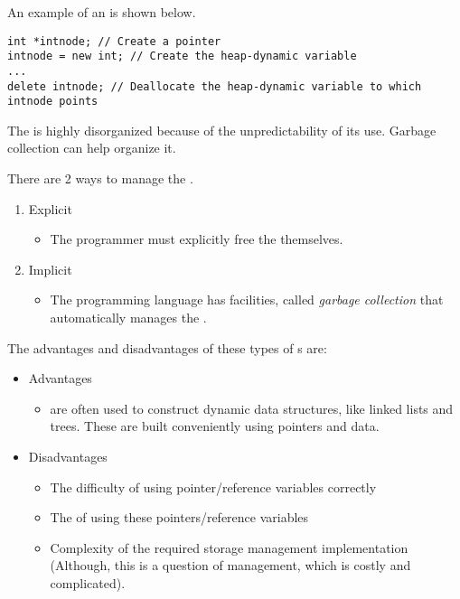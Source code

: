 An example of an  is shown below.
\begin{verbatim}
int *intnode; // Create a pointer
intnode = new int; // Create the heap-dynamic variable
...
delete intnode; // Deallocate the heap-dynamic variable to which intnode points
\end{verbatim}

The  is highly disorganized because of the unpredictability of its use.
Garbage collection can help organize it.

There are 2 ways to manage the .
\begin{enumerate}[noitemsep]
\item Explicit 
  \begin{itemize}[noitemsep]
  \item The programmer must explicitly free the  themselves.
  \end{itemize}
\item Implicit 
  \begin{itemize}[noitemsep]
  \item The programming language has facilities, called \emph{garbage collection} that automatically manages the .
  \end{itemize}
\end{enumerate}

The advantages and disadvantages of these types of s are:
\begin{itemize}[noitemsep]
\item Advantages
  \begin{itemize}[noitemsep]
  \item {} are often used to construct dynamic data structures, like linked lists and trees. These are built conveniently using pointers and data.
  \end{itemize}
\item Disadvantages
  \begin{itemize}[noitemsep]
  \item The difficulty of using pointer/reference variables correctly
  \item The  of using these pointers/reference variables
  \item Complexity of the required storage management implementation (Although, this is a question of  management, which is costly and complicated).
  \end{itemize}
\end{itemize}

